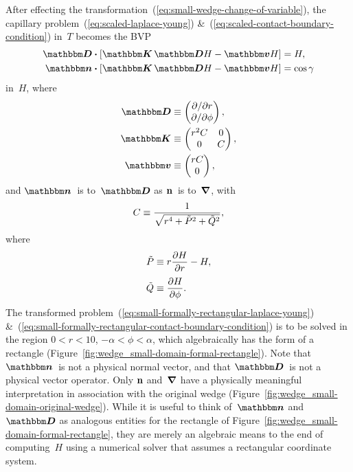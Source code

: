 After effecting the transformation~(\ref{eq:small-wedge-change-of-variable}),
the capillary problem~(\ref{eq:scaled-laplace-young})
\&~(\ref{eq:scaled-contact-boundary-condition}) in~$T$
becomes the BVP
\begin{align}
  \matder \dotp \squarebr[\bulkysize]{\mat{K} \matder H - \mat{v} H}
    &= H,
    \label{eq:small-formally-rectangular-laplace-young} \\
  \mat{n} \dotp \squarebr[\bulkysize]{\mat{K} \matder H - \mat{v} H}
    &= \cos\gamma
    \label{eq:small-formally-rectangular-contact-boundary-condition}
\end{align}
in~$H$, where
\begin{align}
  \matder &\ideq
    \begin{pmatrix}
      \pd / {\pd r} \\
      \pd / {\pd\phi}
    \end{pmatrix},
    \label{eq:small-formally-rectangular-derivative} \\
  \mat{K} &\ideq
    \begin{pmatrix}
      r^2 C & 0 \\
      0 & C
    \end{pmatrix},
    \label{eq:small-formally-rectangular-diffusion-coefficient} \\
  \mat{v} &\ideq
    \begin{pmatrix}
      r C \\
      0
    \end{pmatrix},
    \label{eq:small-formally-rectangular-convection-coefficient}
\end{align}
and $\mat{n}$~is to~$\matder$ as $\mathop{}\!\boldsymbol{\mathbf{n}}$~is to~$\mathop{}\!\boldsymbol{\mathbf{\nabla}}$,
with
\begin{equation}
  C \equiv \frac{1}{\sqrt{r^4 + \tilde{P}^2 + \tilde{Q}^2}},
  \label{eq:small-formally-rectangular-scalar-coefficient}
\end{equation}
where
\begin{align}
  \tilde{P} &\ideq r \pder{H}{r} - H,
    \\[\tallspace]
  \tilde{Q} &\ideq \pder{H}{\phi}.
\end{align}
The transformed problem~(\ref{eq:small-formally-rectangular-laplace-young})
\&~(\ref{eq:small-formally-rectangular-contact-boundary-condition})
is to be solved in the region
$0 < r < 10$, $-\alpha < \phi < \alpha$,
which algebraically has the form of a rectangle
(Figure~\ref{fig:wedge_small-domain-formal-rectangle}).
Note that $\mat{n}$~is not a physical normal vector,
and that $\matder$~is not a physical vector operator.
Only $\mathop{}\!\boldsymbol{\mathbf{n}}$ and~$\mathop{}\!\boldsymbol{\mathbf{\nabla}}$ have a physically meaningful interpretation
in association with the original wedge
(Figure~\ref{fig:wedge_small-domain-original-wedge}).
While it is useful to think of~$\mat{n}$ and~$\matder$
as analogous entities for the rectangle of
Figure~\ref{fig:wedge_small-domain-formal-rectangle},
they are merely an algebraic means to the end of computing~$H$
using a numerical solver that assumes a rectangular coordinate system.

